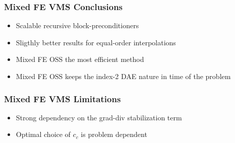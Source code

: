\begin{frame}
\frametitle{Mixed FE VMS Conclusions}
\vfill
\begin{itemize}
\item<1-> Scalable recursive block-preconditioners
\item<2-> Sligthly better results for equal-order interpolations
\item<3-> Mixed FE OSS the most efficient method
\item<4-> Mixed FE OSS keeps the index-2 DAE nature in time of the problem
\end{itemize}
\vfill
\end{frame}
\begin{frame}
\frametitle{Mixed FE VMS Limitations}
\vfill
\begin{itemize}
\item<1-> Strong dependency on the grad-div stabilization term
\item<2-> Optimal choice of $ c_c $ is problem dependent
\end{itemize}
\vfill
\end{frame}